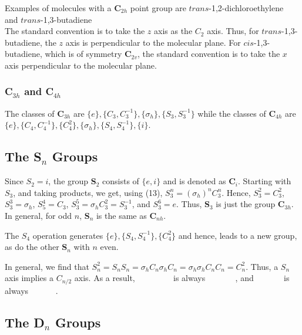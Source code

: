 Examples of molecules with a {\bf C}$_{2h}$ point group are 
$trans$-1,2-dichloroethylene
\begin{equation}
\end{equation}
and $trans$-1,3-butadiene
\begin{equation}
\end{equation}
The standard convention is to take the $z$ axis as the $C_2$ axis.  
Thus, for $trans$-1,3-butadiene, the $z$ axis is perpendicular to the 
molecular plane.  For $cis$-1,3-butadiene, which is of symmetry {\bf 
C}$_{2v}$, the standard convention is to take the $x$ axis 
perpendicular to the molecular plane.

\subsubsection{C$_{3h}$ and C$_{4h}$}

The classes of {\bf C}$_{3h}$ are $\{e\}, \{C_3 , C_3^{-1}\}, 
\{\sigma_h \}, \{S_3, S_3^{-1}\}$ while the classes of {\bf C}$_{4h}$ 
are $\{e\}, \{C_4 , C_4^{-1}\}, \{C^2_4\}, \{\sigma_h\}, \{S_4, 
S_4^{-1}\}, \{i\}$.

\subsection{The S$_n$ Groups}

Since $S_2 = i$, the group {\bf S}$_2$ consists of $\{e,i\}$ and is 
denoted as {\bf C}$_i$.  Starting with $S_3$, and taking products, we 
get, using (13), $S^n_3 = (\sigma_h)^nC^n_3$.  Hence, $S^2_3 = 
C^2_3$, $S^3_3 = \sigma_h$, $S^4_5 = C_3$, $S^5_3 = \sigma_h C^2_3 = 
S_3^{-1}$, and $S^6_3 = e$.  Thus, {\bf S}$_3$ is just the group {\bf 
C}$_{3h}$.  In general, for odd $n$, {\bf S}$_n$ is the same as {\bf 
C}$_{nh}$.

The $S_4$ operation generates $\{e\},\{S_4,S_4^{-1}\}, \{C^2_4\}$ and 
hence, leads to a new group, as do the other {\bf S}$_n$ with $n$ even.

In general, we find that $S^2_n = S_nS_n = \sigma_h C_n\sigma_hC_n = 
\sigma_h \sigma_h C_nC_n = C^2_n$.  Thus, a $S_n$ axis implies a 
$C_{n/2}$ axis.  As a result, ~~~~~~~~ is always ~~~~~~ , and ~~~~~~ 
is always ~~~~~~.

\subsection{The D$_n$ Groups}

